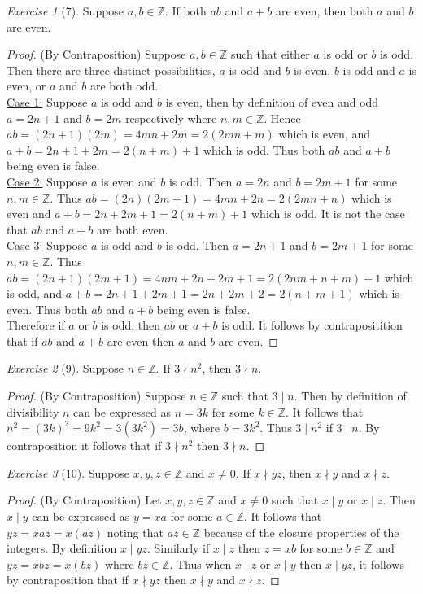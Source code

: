 \documentclass[12pt]{amsart}
\theoremstyle{remark}
\newtheorem*{exercise}{Exercise}%
\def\ZZ{\ensuremath{\mathbb Z}}
\theoremstyle{mycomment}
\begin{document}
\begin{exercise}[7] Suppose $a,b\in\ZZ$. If both $ab$ and $a+b$ are even, then both $a$ and $b$ are even.
\begin{proof}
	(By Contraposition) Suppose $a,b \in \ZZ$ such that either $a$ is odd or $b$ is odd. Then there are three distinct possibilities, $a$ is odd and $b$ is even, $b$ is odd and $a$ is even, or $a$ and $b$ are both odd. \\
	\underline{Case 1:} Suppose $a$ is odd and $b$ is even, then by definition of even and odd $a = 2n+1$ and $b = 2m$ respectively where $n,m \in \ZZ$. Hence $ab = (2n+1)(2m) = 4mn + 2m = 2(2mn+m)$ which is even, and $a + b = 2n+1 + 2m = 2(n + m) + 1$ which is odd. Thus both $ab$ and $a+b$ being even is false. \\ 
	\underline{Case 2:} Suppose $a$ is even and $b$ is odd. Then $a = 2n$ and $b = 2m+1$ for some $n,m \in \ZZ$. Thus $ab = (2n)(2m+1) = 4mn +2n = 2(2mn + n)$ which is even and $a + b = 2n + 2m+1 = 2(n+m) +1$ which is odd. It is not the case that $ab$ and $a+b$ are both even. \\
	\underline{Case 3:} Suppose $a$ is odd and $b$ is odd. Then $a = 2n + 1$ and $b = 2m + 1$ for some $n,m \in \ZZ$. Thus $ab = (2n+1)(2m+1) = 4nm +2n + 2m + 1 = 2(2nm + n + m) + 1$ which is odd, and $a + b = 2n+1 + 2m+1 = 2n + 2m + 2 = 2(n + m + 1)$ which is even. Thus both $ab$ and $a+b$ being even is false. \\
	Therefore if $a$ or $b$ is odd, then $ab$ or $a+b$ is odd. It follows by contrapositition that if $ab$ and $a+b$ are even then $a$ and $b$ are even.
\end{proof}
\end{exercise}

\begin{exercise}[9] Suppose $n\in\ZZ$. If $3\nmid n^{2}$, then $3\nmid n$. %
\begin{proof}
	(By Contraposition)	Suppose $n\in\ZZ$ such that $3 \mid n$. Then by definition of divisibility $n$ can be expressed as $n = 3k$ for some $k \in \ZZ$. It follows that $n^2 = (3k)^2 = 9k^2 = 3(3k^2) = 3b$, where $b = 3k^2$. Thus $3 \mid n^2$ if $3 \mid n$. By contraposition it follows that if $3 \nmid n^2$ then $3 \nmid n$.
\end{proof}
\end{exercise}

\begin{exercise}[10] Suppose $x,y,z\in\ZZ$ and $x\ne 0$.
If $x\nmid yz$, then $x\nmid y$ and $x\nmid z$.
\begin{proof}
	(By Contraposition) Let $x,y,z \in \ZZ$ and $x \ne 0$ such that $x \mid y$ or $x \mid z$. Then $x \mid y$ can be expressed as $y = xa$ for some $a \in \ZZ$. It follows that $yz = xaz = x(az)$ noting that $az\in\ZZ$ because of the closure properties of the integers. By definition $x \mid yz$. Similarly if $x \mid z$ then $z = xb$ for some $b \in \ZZ$ and $yz = xbz = x(bz)$ where $bz \in \ZZ$. Thus when $x \mid z$ or $x \mid y$ then $x \mid yz$, it follows by contraposition that if $x\nmid yz$ then $x \nmid y$ and $x \nmid z$.
\end{proof}
\end{exercise}
\end{document}

